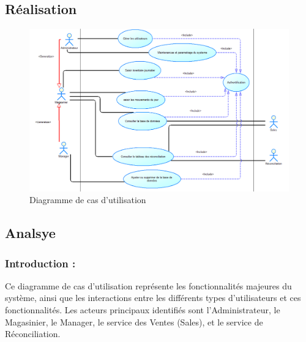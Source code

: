 \documentclass[a4paper, oneside, 12pt, final]{extreport}
\begin{document}
\subsection{Réalisation}
\begin{figure}[h]
    \centering
    \includegraphics[width=1\textwidth]{USE CASE.png} %
    \caption{Diagramme de cas d'utilisation}
    \label{fig:Diagramme de cas d'utilisation}
\end{figure}
\newpage
\subsection{Analsye}
\subsubsection{Introduction :}
Ce diagramme de cas d'utilisation représente les fonctionnalités majeures du système, ainsi que les interactions entre les différents types d'utilisateurs et ces fonctionnalités. Les acteurs principaux identifiés sont l'Administrateur, le Magasinier, le Manager, le service des Ventes (Sales), et le service de Réconciliation.
\end{document}
